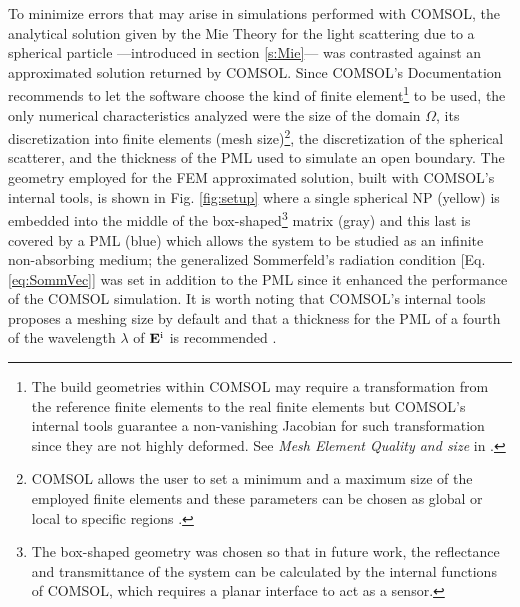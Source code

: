 To minimize errors that may arise in simulations performed with COMSOL, the analytical solution given by the Mie Theory for the light scattering due to a spherical particle ---introduced in section \ref{s:Mie}--- was contrasted against an approximated solution returned by COMSOL. Since COMSOL's Documentation \cite{comsol_doc} recommends to let the software choose the kind of finite element\footnote{The build geometries within COMSOL may require a transformation from the reference finite elements to the real finite elements but COMSOL's internal tools guarantee a non-vanishing Jacobian for such transformation since they are not highly deformed. See \textit{Mesh Element Quality and size} in \cite{comsol_doc}.} to be used, the only numerical characteristics analyzed were the size of the domain $\Omega$, its discretization into finite elements (mesh size)\footnote{COMSOL allows the user to set a minimum and a maximum size of the employed finite elements and these parameters can be chosen as global or local to specific regions \cite{comsol_doc}.}, the discretization of the spherical scatterer, and the thickness of the PML used to simulate an open boundary. The geometry employed for the FEM approximated solution, built with COMSOL's internal tools, is shown in Fig. \ref{fig:setup} where a single spherical NP (yellow) is embedded into  the middle of the box-shaped\footnote{The box-shaped geometry was chosen so that in future work, the reflectance and transmittance of the system can be calculated by the internal functions of COMSOL, which requires a planar interface to act as a sensor.} matrix (gray) and this last is covered by a PML (blue) which allows the system to be studied as an infinite non-absorbing medium; the generalized Sommerfeld's radiation condition [Eq. \eqref{eq:SommVec}] was set in addition to the PML since it enhanced the performance of the COMSOL simulation. It is worth noting that COMSOL's internal tools proposes a meshing size by default \cite{comsol_doc} and that a thickness for the PML of a fourth of the wavelength $\lambda$ of $\vb{E}^\text{i}$ is recommended \cite{comsol_wave}.

